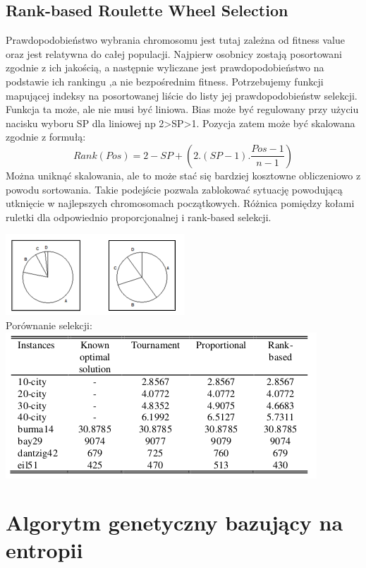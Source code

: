 \documentclass[11pt]{article}
\begin{document}
\subsection{Rank-based Roulette Wheel Selection}
Prawdopodobieństwo wybrania chromosomu jest tutaj zależna od fitness value oraz jest relatywna do całej populacji. Najpierw osobnicy zostają posortowani zgodnie z ich jakością, a następnie wyliczane jest prawdopodobieństwo  na podstawie ich rankingu ,a nie bezpośrednim fitness. Potrzebujemy funkcji mapującej indeksy na posortowanej liście do listy jej prawdopodobieństw selekcji. Funkcja ta może, ale nie musi być liniowa. Bias może być regulowany przy użyciu nacisku wyboru SP dla liniowej np 2>SP>1. Pozycja zatem może być skalowana zgodnie z formułą:\\
$$Rank(Pos)=2-SP + (2.(SP-1).\frac{Pos-1}{n-1})$$ 
Można uniknąć skalowania, ale to może stać się bardziej kosztowne obliczeniowo z powodu sortowania. Takie podejście pozwala zablokować sytuację powodującą utknięcie w najlepszych chromosomach początkowych. Różnica pomiędzy kołami ruletki dla odpowiednio proporcjonalnej i rank-based selekcji.
\begin{center}
\includegraphics[scale=1.0]{rb.png}\\
Porównanie selekcji:
\includegraphics[scale=.7]{cs.png}
\end{center}
\section{Algorytm genetyczny bazujący na entropii}
\end{document}
